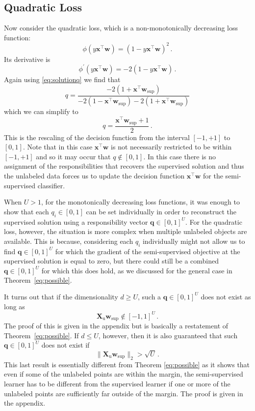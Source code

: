 \documentclass[twoside]{memoir}\usepackage[]{graphicx}\usepackage{xcolor}
\begin{document}
\subsection{Quadratic Loss} \label{section:quadraticloss}
Now consider the quadratic loss, which is a non-monotonically decreasing loss function:
$$\phi(y \mathbf{x}^\top \mathbf{w})=(1-y \mathbf{x}^\top \mathbf{w})^2 \,.$$
Its derivative is
$$\phi^\prime(y \mathbf{x}^\top \mathbf{w}) = - 2 (1-y \mathbf{x}^\top \mathbf{w}) \, .$$
Again using \eqref{eq:solutionq} we find that
$$q = \frac{-2 (1+\mathbf{x}^\top \mathbf{w}_\mathrm{sup})}{-2 (1-\mathbf{x}^\top \mathbf{w}_\mathrm{sup}) -2 (1+\mathbf{x}^\top \mathbf{w}_\mathrm{sup})}$$
which we can simplify to
$$q = \frac{ \mathbf{x}^\top \mathbf{w}_\mathrm{sup} + 1}{2} \,.$$
This is the rescaling of the decision function from the interval $[-1,+1]$ to $[0,1]$. Note that in this case $\mathbf{x}^\top \mathbf{w}$ is not necessarily restricted to be within $[-1,+1]$ and so it may occur that $q \notin [0,1]$. In this case there is no assignment of the responsibilities that recovers the supervised solution and thus the unlabeled data forces us to update the decision function $\mathbf{x}^\top \mathbf{w}$ for the semi-supervised classifier.

When $U>1$, for the monotonically decreasing loss functions, it was enough to show that each $q_i \in [0,1]$ can be set individually in order to reconstruct the supervised solution using a responsibility vector $\mathbf{q} \in [0,1]^U$. For the quadratic loss, however, the situation is more complex when multiple unlabeled objects are available. This is because, considering each $q_i$ individually might not allow us to find  $\mathbf{q} \in [0,1]^U$ for which the gradient of the semi-supervised objective at the supervised solution is equal to zero, but there could still be a combined $\mathbf{q} \in [0,1]^U$ for which this does hold, as we discussed for the general case in Theorem~\ref{eq:possible}.

It turns out that if the dimensionality $d \geq U$, such a $\mathbf{q} \in [0,1]^U$ does not exist as long as
$$\mathbf{X}_\mathrm{u} \mathbf{w}_\mathrm{sup} \notin  [-1,1]^U \, .$$  The proof of this is given in the appendix but is basically a restatement of Theorem~\ref{eq:possible}.  If $d \leq U$, however, then it is also guaranteed that such $\mathbf{q} \in [0,1]^U$ does not exist if
$$\| \mathbf{X}_\mathrm{u} \mathbf{w}_\mathrm{sup} \|_2 > \sqrt{U} \, .$$
This last result is essentially different from Theorem \ref{eq:possible} as it shows that even if some of the unlabeled points are within the margin, the semi-supervised learner has to be different from the supervised learner if one or more of the unlabeled points are sufficiently far outside of the margin. The proof is given in the appendix.
\end{document}
